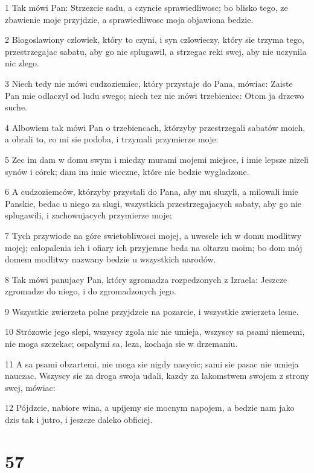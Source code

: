 \par 1 Tak mówi Pan: Strzezcie sadu, a czyncie sprawiedliwosc; bo blisko tego, ze zbawienie moje przyjdzie, a sprawiedliwosc moja objawiona bedzie.
\par 2 Blogoslawiony czlowiek, który to czyni, i syn czlowieczy, który sie trzyma tego, przestrzegajac sabatu, aby go nie splugawil, a strzegac reki swej, aby nie uczynila nic zlego.
\par 3 Niech tedy nie mówi cudzoziemiec, który przystaje do Pana, mówiac: Zaiste Pan mie odlaczyl od ludu swego; niech tez nie mówi trzebieniec: Otom ja drzewo suche.
\par 4 Albowiem tak mówi Pan o trzebiencach, którzyby przestrzegali sabatów moich, a obrali to, co mi sie podoba, i trzymali przymierze moje:
\par 5 Zec im dam w domu swym i miedzy murami mojemi miejsce, i imie lepsze nizeli synów i córek; dam im imie wieczne, które nie bedzie wygladzone.
\par 6 A cudzoziemców, którzyby przystali do Pana, aby mu sluzyli, a milowali imie Panskie, bedac u niego za slugi, wszystkich przestrzegajacych sabaty, aby go nie splugawili, i zachowujacych przymierze moje;
\par 7 Tych przywiode na góre swietobliwosci mojej, a uwesele ich w domu modlitwy mojej; calopalenia ich i ofiary ich przyjemne beda na oltarzu moim; bo dom mój domem modlitwy nazwany bedzie u wszystkich narodów.
\par 8 Tak mówi panujacy Pan, który zgromadza rozpedzonych z Izraela: Jeszcze zgromadze do niego, i do zgromadzonych jego.
\par 9 Wszystkie zwierzeta polne przyjdzcie na pozarcie, i wszystkie zwierzeta lesne.
\par 10 Strózowie jego slepi, wszyscy zgola nic nie umieja, wszyscy sa psami niememi, nie moga szczekac; ospalymi sa, leza, kochaja sie w drzemaniu.
\par 11 A sa psami obzartemi, nie moga sie nigdy nasycic; sami sie pasac nie umieja nauczac. Wszyscy sie za droga swoja udali, kazdy za lakomstwem swojem z strony swej, mówiac:
\par 12 Pójdzcie, nabiore wina, a upijemy sie mocnym napojem, a bedzie nam jako dzis tak i jutro, i jeszcze daleko obficiej.

\chapter{57}

